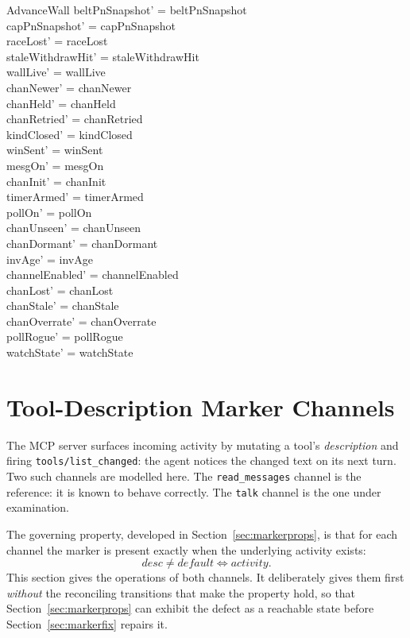 \documentclass[a4paper,10pt,fleqn]{article}
\begin{document}
\begin{schema}{AdvanceWall}
  beltPnSnapshot' = beltPnSnapshot \\
  capPnSnapshot' = capPnSnapshot \\
  raceLost' = raceLost \\
  staleWithdrawHit' = staleWithdrawHit \\
  wallLive' = wallLive \\
  chanNewer' = chanNewer \\
  chanHeld' = chanHeld \\
  chanRetried' = chanRetried \\
  kindClosed' = kindClosed \\
  winSent' = winSent \\
  mesgOn' = mesgOn \\
  chanInit' = chanInit \\
  timerArmed' = timerArmed \\
  pollOn' = pollOn \\
  chanUnseen' = chanUnseen \\
  chanDormant' = chanDormant \\
  invAge' = invAge \\
  channelEnabled' = channelEnabled \\
  chanLost' = chanLost \\
  chanStale' = chanStale \\
  chanOverrate' = chanOverrate \\
  pollRogue' = pollRogue \\
  watchState' = watchState
\end{schema}

\section{Tool-Description Marker Channels}
\label{sec:marker}

The MCP server surfaces incoming activity by mutating a tool's
\emph{description} and firing \texttt{tools/list\_changed}: the agent
notices the changed text on its next turn.  Two such channels are
modelled here.  The \texttt{read\_messages} channel is the reference: it
is known to behave correctly.  The \texttt{talk} channel is the one under
examination.

The governing property, developed in Section~\ref{sec:markerprops}, is
that for each channel the marker is present exactly when the underlying
activity exists:
\[
  desc \neq default \iff activity.
\]
This section gives the operations of both channels.  It deliberately
gives them first \emph{without} the reconciling transitions that make the
property hold, so that Section~\ref{sec:markerprops} can exhibit the
defect as a reachable state before Section~\ref{sec:markerfix} repairs
it.
\end{document}
